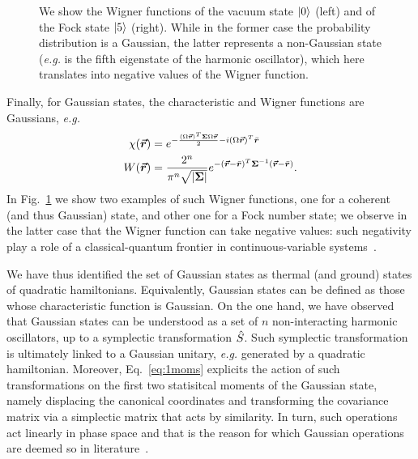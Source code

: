 \begin{figure}[t!]
\begin{subfigure}[b]{0.49\textwidth}
    \end{subfigure}
\caption{We show the Wigner functions of the vacuum state $\ket{0}$ (left) and of the Fock state $\ket{5}$ (right). While in the former case the probability distribution is a Gaussian, the latter represents a non-Gaussian state (\textit{e.g.} is the fifth eigenstate of the harmonic oscillator), which here translates into negative values of the Wigner function. }
\label{fig:wigners}
\end{figure}
Finally, for Gaussian states, the characteristic and Wigner functions are Gaussians, \textit{e.g.}
\begin{align}\label{gauss_char_wigner}
\chi(\bm{\vec{r}}) &= e^{-\frac{(\Omega \bm{\vec{r}})^T\bm{\Sigma} \Omega \bm{\vec{r}}}{2} - i (\Omega \bm{\vec{r}})^T \bar{\bm{r}}} \\
W(\bm{\vec{r}}) &= \frac{2^n}{\pi^n \sqrt{|\bm{\Sigma}|}}e^{-(\bm{\vec{r}} - \bar{\bm{r}})^T\bm{\Sigma}^{-1}(\bm{\vec{r}} - \bar{\bm{r}})}.
\end{align}
In Fig.~\ref{fig:wigners} we show two examples of such Wigner functions, one for a coherent (and thus Gaussian) state, and other one for a Fock number state; we observe in the latter case that the Wigner function can take negative values: such negativity play a role of a classical-quantum frontier in continuous-variable systems~\cite{nongaussian}.

We have thus identified the set of Gaussian states as thermal (and ground) states of quadratic hamiltonians. Equivalently, Gaussian states can be defined as those whose characteristic function is Gaussian. On the one hand, we have observed that Gaussian states can be understood as a set of $n$ non-interacting harmonic oscillators, up to a symplectic transformation $\hat{S}$. Such symplectic transformation is ultimately linked to a Gaussian unitary, \textit{e.g.} generated by a quadratic hamiltonian. Moreover, Eq.~\ref{eq:1moms} explicits the action of such transformations on the first two statisitcal moments of the Gaussian state, namely displacing the canonical coordinates and transforming the covariance matrix via a simplectic matrix that acts by similarity. In turn, such operations act linearly in phase space and that is the reason for which Gaussian operations are deemed so in literature~\cite{Weedbrook2012Gaussian,Olivares2012}.
